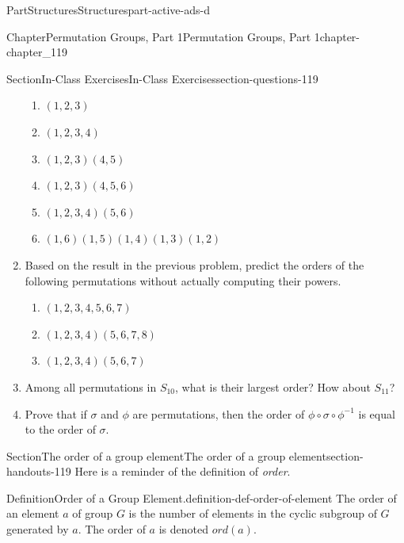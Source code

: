 \documentclass[oneside,10pt,]{book}
\numberwithin{equation}{section}
\begin{document}
\begin{partptx}{Part}{Structures}{}{Structures}{}{}{part-active-ads-d}
\begin{chapterptx}{Chapter}{Permutation Groups, Part 1}{}{Permutation Groups, Part 1}{}{}{chapter-chapter_119}
\begin{sectionptx}{Section}{In-Class Exercises}{}{In-Class Exercises}{}{}{section-questions-119}
\begin{enumerate}[label=\arabic*.]
\begin{multicols}{3}
\begin{enumerate}[label=(\alph*)]
\item{}\(\displaystyle (1,2,3)\)%
\item{}\(\displaystyle (1,2,3,4)\)%
\item{}\(\displaystyle (1,2,3)(4,5)\)%
\item{}\(\displaystyle (1,2,3)(4,5,6)\)%
\item{}\(\displaystyle (1,2,3,4)(5,6)\)%
\item{}\(\displaystyle (1,6)(1,5)(1,4)(1,3)(1,2)\)%
\end{enumerate}
\end{multicols}
%
\item{}Based on the result in the previous problem, predict the orders of the following permutations without actually computing their powers.%
\begin{multicols}{3}
\begin{enumerate}[label=(\alph*)]
\item{}\(\displaystyle (1,2,3,4,5,6,7)\)%
\item{}\(\displaystyle (1,2,3,4)(5,6,7,8)\)%
\item{}\(\displaystyle (1,2,3,4)(5,6,7)\)%
\end{enumerate}
\end{multicols}
%
\item{}Among all permutations in \(S_{10}\), what is their largest order?  How about \(S_{11}\)?%
\item{}Prove that if \(\sigma\) and \(\phi\) are permutations, then the order of \(\phi \circ \sigma \circ \phi^{-1}\) is equal to the order of \(\sigma\).%
\end{enumerate}
%
\end{sectionptx}
%
%
\typeout{************************************************}
\typeout{************************************************}
%
\begin{sectionptx}{Section}{The order of a group element}{}{The order of a group element}{}{}{section-handouts-119}
Here is a reminder of the definition of \emph{order}.%
\begin{definition}{Definition}{Order of a Group Element.}{definition-def-order-of-element}%
%
\label{notation-def-order-of-element-c}%
The order of an element \(a\) of group \(G\) is the number of elements in the cyclic subgroup of \(G\) generated by \(a\). The order of \(a\) is denoted \(ord(a)\).%
\end{definition}

\end{sectionptx}
\end{chapterptx}
\end{partptx}
\end{document}
